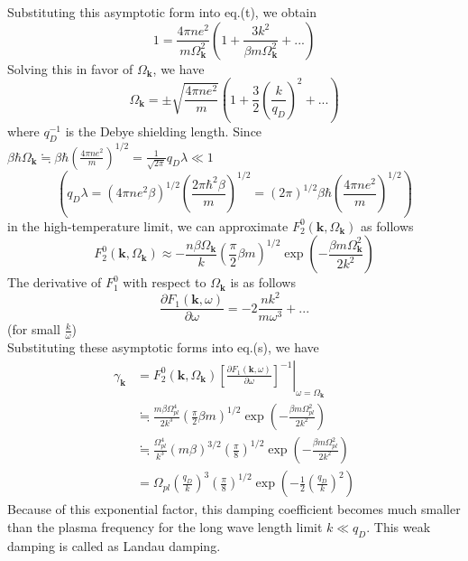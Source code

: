  Substituting this asymptotic form into eq.(t), we obtain
\begin{equation}
1=\frac{4\pi ne^2}{m\Omega_{\mathbf k}^2}\left( 1+\frac{3k^2}{\beta m\Omega_{\mathbf k}^2}+... \right)
\end{equation}
 Solving this in favor of $\Omega_{\mathbf k}$, we have 
\begin{equation}
\Omega_{\mathbf k}=\pm \sqrt{\frac{4\pi ne^2}{m}}\left( 1+\frac{3}{2}\left( \frac{k}{q_D} \right)^2+... \right)
\end{equation}
where $q_D^{-1}$ is the Debye shielding length.
 Since $\beta\hbar \Omega_{\mathbf k}\fallingdotseq\beta\hbar\left(\frac{4\pi ne^2}{m}\right)^{1/2}=\frac{1}{\sqrt{2\pi}}q_D\lambda\ll 1$
\[
\left( q_D\lambda=(4\pi ne^2\beta)^{1/2}\left( \frac{2\pi\hbar^2\beta}{m} \right)^{1/2}=(2\pi)^{1/2}\beta\hbar\left(\frac{4\pi ne^2}{m}\right)^{1/2} \right)
\]
in the high-temperature limit, we can approximate $F_2^0(\mathbf k,\Omega_{\mathbf k})$ as follows
\begin{equation}
F_2^0(\mathbf k,\Omega_{\mathbf k})\approx -\frac{n\beta\Omega_{\mathbf k}}{k} \left( \frac{\pi}{2}\beta m \right)^{1/2} \exp \left( -\frac{\beta m\Omega_{\mathbf k}^2}{2k^2} \right)
\end{equation}
 The derivative of $F_1^0$ with respect to $\Omega_{\mathbf k}$ is as follows
\[
\frac{\partial F_1(\mathbf k,\omega)}{\partial \omega}=-2\frac{nk^2}{m\omega^3}+...
\]
(for small $\frac{k}{\omega}$)\\
 Substituting these asymptotic forms into eq.(s), we have
\begin{equation}
\begin{aligned}
\gamma_{\mathbf k}&=F_2^0(\mathbf k,\Omega_{\mathbf k})\left. \left[ \frac{\partial F_1(\mathbf k,\omega)}{\partial \omega} \right]^{-1}\right|_{\omega=\Omega_{\mathbf k}}\\
&\fallingdotseq\frac{m\beta \Omega_{pl}^4}{2k^3} \left( \frac{\pi}{2}\beta m \right)^{1/2} \exp\left( -\frac{\beta m\Omega_{pl}^2}{2k^2} \right)\\
&\fallingdotseq\frac{\Omega_{pl}^4}{k^3}(m\beta)^{3/2}\left( \frac{\pi}{8} \right)^{1/2}\exp\left( -\frac{\beta m\Omega_{pl}^2}{2k^2} \right)\\
&=\Omega_{pl}\left( \frac{q_D}{k} \right)^3\left( \frac{\pi}{8} \right)^{1/2}\exp\left( -\frac{1}{2}\left( \frac{q_D}{k} \right)^2 \right)
\end{aligned}
\end{equation}
Because of this exponential factor, this damping coefficient becomes much smaller
than the plasma frequency for the long wave length limit $k\ll q_D$.
 This weak damping is called as Landau damping.

